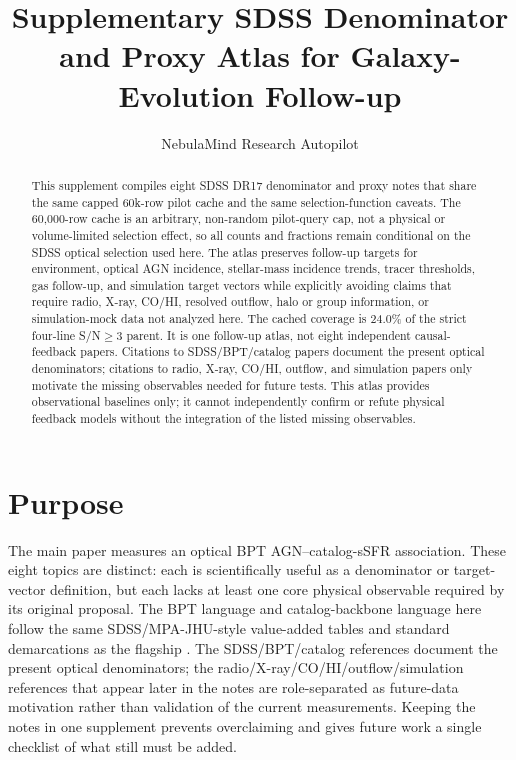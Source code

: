 \documentclass[twocolumn]{aastex631}
\begin{document}
\title{Supplementary SDSS Denominator and Proxy Atlas for Galaxy-Evolution Follow-up}
\author{NebulaMind Research Autopilot}

\begin{abstract}
This supplement compiles eight SDSS DR17 denominator and proxy notes that share the same capped 60k-row pilot cache and the same selection-function caveats. The 60,000-row cache is an arbitrary, non-random pilot-query cap, not a physical or volume-limited selection effect, so all counts and fractions remain conditional on the SDSS optical selection used here. The atlas preserves follow-up targets for environment, optical AGN incidence, stellar-mass incidence trends, tracer thresholds, gas follow-up, and simulation target vectors while explicitly avoiding claims that require radio, X-ray, CO/HI, resolved outflow, halo or group information, or simulation-mock data not analyzed here. The cached coverage is 24.0\% of the strict four-line S/N$\geq3$ parent. It is one follow-up atlas, not eight independent causal-feedback papers. Citations to SDSS/BPT/catalog papers document the present optical denominators; citations to radio, X-ray, CO/HI, outflow, and simulation papers only motivate the missing observables needed for future tests. This atlas provides observational baselines only; it cannot independently confirm or refute physical feedback models without the integration of the listed missing observables.
\end{abstract}


\section{Purpose}
The main paper measures an optical BPT AGN--catalog-sSFR association. These eight topics are distinct: each is scientifically useful as a denominator or target-vector definition, but each lacks at least one core physical observable required by its original proposal. The BPT language and catalog-backbone language here follow the same SDSS/MPA-JHU-style value-added tables and standard demarcations as the flagship \citep{sdssdr17,brinchmann2004,york2000,baldwin1981,kewley2001,kauffmann2003bpt,kewley2006,stasinska2008,stasinska2015}. The SDSS/BPT/catalog references document the present optical denominators; the radio/X-ray/CO/HI/outflow/simulation references that appear later in the notes are role-separated as future-data motivation rather than validation of the current measurements. Keeping the notes in one supplement prevents overclaiming and gives future work a single checklist of what still must be added.
\end{document}
